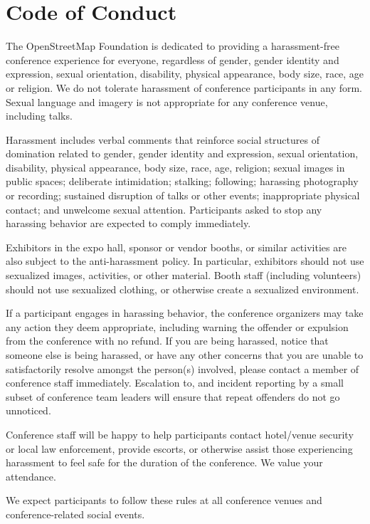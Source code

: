 \newpage
\section*{Code of Conduct}
\label{coc}
\pagestyle{cropmarksstyle}

\footnotesize{
  The OpenStreetMap Foundation is dedicated to providing a harassment-free conference experience for
  everyone, regardless of gender, gender identity and expression, sexual orientation, disability,
  physical appearance, body size, race, age or religion. We do not tolerate harassment of conference
  participants in any form. Sexual language and imagery is not appropriate for any conference venue,
  including talks.
  
  Harassment includes verbal comments that reinforce social structures of domination related to
  gender, gender identity and expression, sexual orientation, disability, physical appearance, body
  size, race, age, religion; sexual images in public spaces; deliberate intimidation; stalking;
  following; harassing photography or recording; sustained disruption of talks or other events;
  inappropriate physical contact; and unwelcome sexual attention. Participants asked to stop any
  harassing behavior are expected to comply immediately.
  
  Exhibitors in the expo hall, sponsor or vendor booths, or similar activities are also subject to
  the anti-harassment policy. In particular, exhibitors should not use sexualized images,
  activities, or other material. Booth staff (including volunteers) should not use sexualized
  clothing, or otherwise create a sexualized environment.
  
  If a participant engages in harassing behavior, the conference organizers may take any action they
  deem appropriate, including warning the offender or expulsion from the conference with no refund.
  If you are being harassed, notice that someone else is being harassed, or have any other concerns
  that you are unable to satisfactorily resolve amongst the person(s) involved, please contact a
  member of conference staff immediately. Escalation to, and incident reporting by a small subset of
  conference team leaders will ensure that repeat offenders do not go unnoticed.
  
  Conference staff will be happy to help participants contact hotel/venue security or local law
  enforcement, provide escorts, or otherwise assist those experiencing harassment to feel safe for
  the duration of the conference. We value your attendance.
  
  We expect participants to follow these rules at all conference venues and conference-related
  social events.
}
